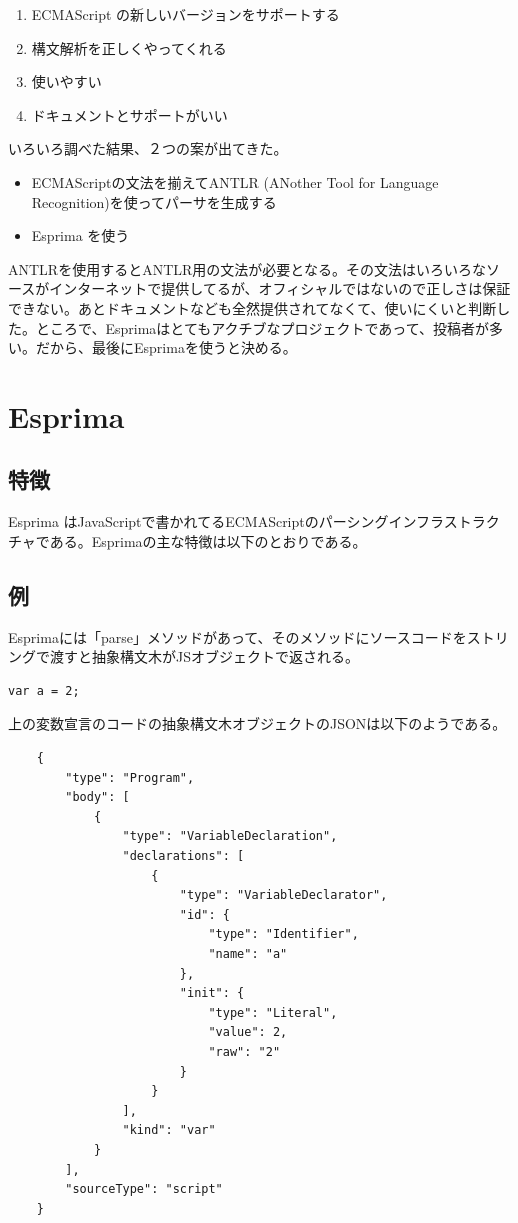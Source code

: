 \documentclass[12pt]{article}
\begin{document}
\begin{enumerate}
\item ECMAScript の新しいバージョンをサポートする
\item 構文解析を正しくやってくれる
\item 使いやすい
\item ドキュメントとサポートがいい
\end{enumerate}

いろいろ調べた結果、２つの案が出てきた。

\begin{itemize}
\item ECMAScriptの文法を揃えてANTLR\cite{antlr} (ANother Tool for Language Recognition)を使ってパーサを生成する
\item Esprima を使う
\end{itemize}

ANTLRを使用するとANTLR用の文法が必要となる。その文法はいろいろなソースがインターネットで提供してるが、オフィシャルではないので正しさは保証できない。あとドキュメントなども全然提供されてなくて、使いにくいと判断した。ところで、Esprimaはとてもアクチブなプロジェクトであって、投稿者が多い。だから、最後にEsprimaを使うと決める。

\section{Esprima}
\subsection{特徴}
Esprima \cite{esprima}はJavaScriptで書かれてるECMAScriptのパーシングインフラストラクチャである。Esprimaの主な特徴は以下のとおりである\cite{esprima}。
\subsection{例}
Esprimaには「parse」メソッドがあって、そのメソッドにソースコードをストリングで渡すと抽象構文木がJSオブジェクトで返される。

\begin{lstlisting}
var a = 2;
\end{lstlisting}
\FloatBarrier

上の変数宣言のコードの抽象構文木オブジェクトのJSONは以下のようである。

\begin{lstlisting}
	{
	    "type": "Program",
	    "body": [
	        {
	            "type": "VariableDeclaration",
	            "declarations": [
	                {
	                    "type": "VariableDeclarator",
	                    "id": {
	                        "type": "Identifier",
	                        "name": "a"
	                    },
	                    "init": {
	                        "type": "Literal",
	                        "value": 2,
	                        "raw": "2"
	                    }
	                }
	            ],
	            "kind": "var"
	        }
	    ],
	    "sourceType": "script"
	}
\end{lstlisting}
\FloatBarrier
\end{document}
